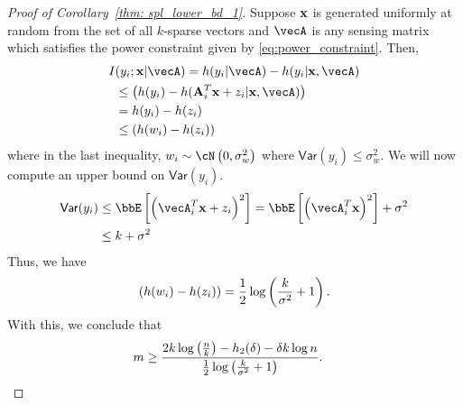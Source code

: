 \begin{proof}[Proof of Corollary~\ref{thm: spl_lower_bd_1}]
Suppose $\mathbf{x}$ is generated uniformly at random from the set of all $k$-sparse vectors and $\vecA$ is any sensing matrix which satisfies the power constraint given by \eqref{eq:power_constraint}. Then,
\begin{align*}
I&(y_i;\bx| \vecA) = h(y_i|\vecA)-h(y_i|\bx,\vecA)\\
&\leq \inp{h(y_i)-h(\mathbf{A}_i^T\bx + z_i|\bx,  \vecA)}\\
& = h(y_i) - h(z_i)\\
&\leq \inp{h(w_i)-h(z_i)}
\end{align*} where in the last inequality, $w_i\sim\cN\inp{0, \sigma^2_w}$ where $\mathsf{Var}(y_i)\leq \sigma^2_w$. We will now compute an upper bound on $\mathsf{Var}(y_i)$.
\begin{align*}
\mathsf{Var}(y_i) &\leq \bbE\insq{\inp{\vecA_i^T\bx+z_i}^2} = \bbE\insq{\inp{\vecA_i^T\bx}^2} + \sigma^2\\
&\leq k + \sigma^2
\end{align*} 
Thus, we have
\begin{align}
\left(h(w_i)-h(z_i)\right)=\frac{1}{2}\log\left(\frac{{k}}{\sigma^2}+1\right).\label{eq:new2}
\end{align}
With this, we conclude that
\begin{align*}
m&\geq \frac{2k\log\left(\frac{n}{k}\right)- h_2(\delta) - \delta k\log{n}}{\frac{1}{2}\log\left(\frac{{k}}{\sigma^2}+1\right)}.
\end{align*} 



\end{proof}

